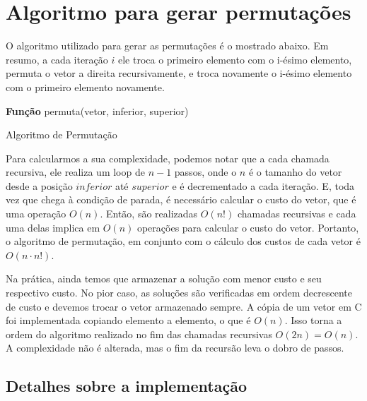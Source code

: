 \documentclass[a4paper, 12pt]{article} %
\begin{document}
	\section{Algoritmo para gerar permutações}
	
	O algoritmo utilizado para gerar as permutações é o mostrado abaixo. Em resumo, a cada iteração $i$ ele troca o primeiro elemento com o i-ésimo elemento, permuta o vetor a direita recursivamente, e troca novamente o i-ésimo elemento com o primeiro elemento novamente.
	
	\begin{algorithm}[h]
	\textbf{Função} permuta(vetor, inferior, superior) 
	
	\caption{Algoritmo de Permutação}
	\end{algorithm}
	
	Para calcularmos a sua complexidade, podemos notar que a cada chamada recursiva, ele realiza um loop de $n - 1$ passos, onde o $n$ é o tamanho do vetor desde a posição $inferior$ até $superior$ e é decrementado a cada iteração. E, toda vez que chega à condição de parada, é necessário calcular o custo do vetor, que é uma operação $O(n)$. Então, são realizadas $O(n!)$ chamadas recursivas e cada uma delas implica em $O(n)$ operações para calcular o custo do vetor. Portanto, o algoritmo de permutação, em conjunto com o cálculo dos custos de cada vetor é $O(n \cdot n!)$.
	
	Na prática, ainda temos que armazenar a solução com menor custo e seu respectivo custo. No pior caso, as soluções são verificadas em ordem decrescente de custo e devemos trocar o vetor armazenado sempre. A cópia de um vetor em C foi implementada copiando elemento a elemento, o que é $O(n)$. Isso torna a ordem do algoritmo realizado no fim das chamadas recursivas $O(2n) = O(n)$. A complexidade não é alterada, mas o fim da recursão leva o dobro de passos. 
	
	\subsection{Detalhes sobre a implementação}
		
\end{document}
